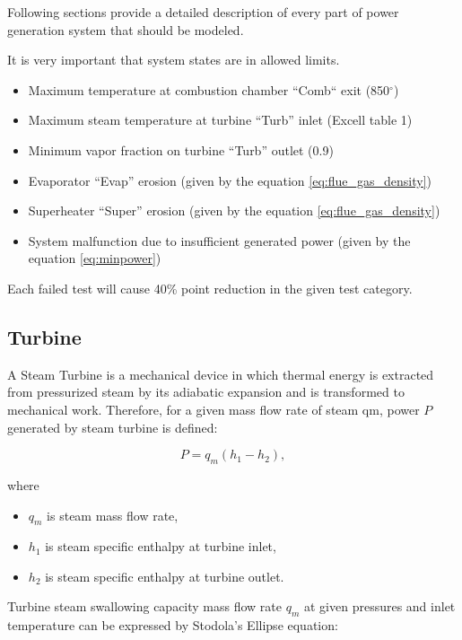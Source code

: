 \documentclass[openany]{book}
\begin{document}
	
	Following sections provide a detailed description of every part of power 
	generation system that should be modeled.
	
	
	It is very important that system states are in allowed limits. 
	
	\begin{itemize}
		\item Maximum temperature at combustion chamber “Comb“ exit 
		(850$^\circ$)
		\item Maximum steam temperature at turbine “Turb” inlet (Excell table 1)
		\item Minimum vapor fraction on turbine “Turb” outlet (0.9)
		\item Evaporator “Evap” erosion (given by the equation 
		\ref{eq:flue_gas_density})
		\item Superheater “Super” erosion (given by the equation 
		\ref{eq:flue_gas_density})
		\item System malfunction due to insufficient generated power (given by 
		the equation \ref{eq:minpower})
	\end{itemize}
	
	Each failed test will cause 40\% point reduction in the given test category.
	
	\subsection{Turbine}
	
	A Steam Turbine is a mechanical device in which thermal energy is extracted 
	from pressurized steam by its adiabatic expansion and is transformed to 
	mechanical work.  Therefore, for a given mass flow rate of steam qm, power 
	$P$ generated by steam turbine is defined:
	
	\begin{equation}\label{eq:power}
	P = q_m(h_1 - h_2),
	\end{equation}
	
	\noindent
	where 
	
	\begin{itemize}
		\item $q_m$ is steam mass flow rate, 
		\item $h_1$ is steam specific enthalpy at turbine inlet,
		\item $h_2$ is steam specific enthalpy at turbine outlet.
	\end{itemize}
	
	Turbine steam swallowing capacity mass flow rate $q_m$ at given pressures 
	and inlet temperature can be expressed by Stodola’s Ellipse equation:
	
\end{document}
